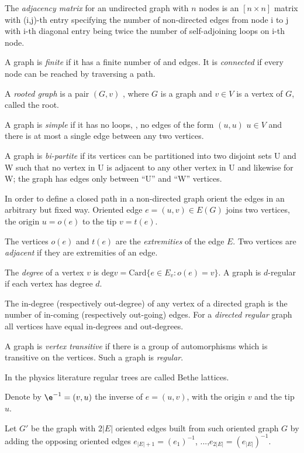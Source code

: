 \begin{description}
The \emph{adjacency  matrix} for an undirected graph  with $n$ nodes is
an $[n\!\times\!n]$ matrix  with (i,j)-th  entry
specifying  the number  of  non-directed  edges from  node i to j with
i-th  diagonal entry  being  twice  the  number  of self-adjoining  loops
on i-th node.

A graph is \emph{finite} if it has a finite number of and  edges. It is
\emph{connected} if every  node  can  be  reached by  traversing a path.

A \emph{rooted graph} is a pair $(G, v)$ , where $G$ is a graph and
$v\in V$ is a vertex of $G$, called the root.

A graph is \emph{simple} if it has no  loops, \ie,  no  edges  of the
form  $(u,u)$ $u\in V$ and  there  is  at most  a  single  edge between
any two vertices.

A graph is \emph{bi-partite} if its vertices can be partitioned into two
disjoint sets U and W such that no vertex in U is adjacent to any other
vertex in U and likewise for W; the graph has edges only between ``U''
and ``W'' vertices.

In order to define a closed path in a non-directed graph orient the
edges in an arbitrary but fixed way.
Oriented edge $e=(u,v)\in E(G)$ joins two vertices, the origin
$u=o(e)$
to the tip $v=t(e)$.

The vertices $o(e)$ and $t(e)$ are the \emph{extremities} of the edge
$E$. Two vertices are \emph{adjacent} if they are extremities of an edge.

The \emph{degree} of a vertex $v$ is
$\mbox{deg} v = \mbox{Card} \{e \in E_v : o(e) = v\}$.
A graph is $d$-regular if each vertex has degree $d$.

The in-degree (respectively out-degree) of any vertex of a directed graph is
the number of in-coming (respectively out-going) edges.
For a \emph{directed regular} graph all vertices have equal in-degrees
and out-degrees.

A  graph is \emph{vertex transitive} if there is a group of automorphisms
which is transitive on the vertices. Such a graph is \emph{regular}.

In the
physics literature regular trees are called Bethe lattices.

Denote by $\e^{-1}=(v,u)$ the inverse of $e=(u,v)$,
with the origin $v$ and the tip $u$.

Let $G'$ be the graph with $2|E|$ oriented
edges built from such oriented graph $G$ by adding
the opposing oriented edges $e_{|E|+1}=(e_{1})^{-1}$,
...,$e_{2 |E|}=(e_{|E|})^{-1}$.


\end{description}
